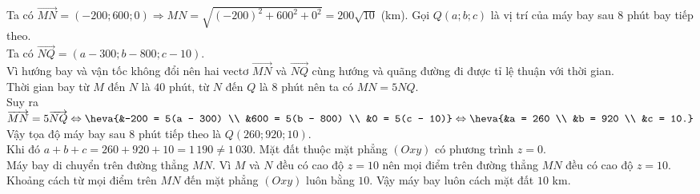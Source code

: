 \begin{ex}
{\begin{center}
		\end{center}
		\begin{itemchoice}
			\itemch Ta có $\overrightarrow{MN} = (-200; 600; 0) \Rightarrow MN = \sqrt{(-200)^2 + 600^2 + 0^2} = 200\sqrt{10}$ (km).
			\itemch Gọi $Q(a; b; c)$ là vị trí của máy bay sau $8$ phút bay tiếp theo.\\
			Ta có $\overrightarrow{NQ} = (a - 300; b - 800; c - 10)$.\\
			Vì hướng bay và vận tốc không đổi nên hai vectơ $\overrightarrow{MN}$ và $\overrightarrow{NQ}$ cùng hướng và quãng đường đi được tỉ lệ thuận với thời gian.\\
			Thời gian bay từ $M$ đến $N$ là $40$ phút, từ $N$ đến $Q$ là $8$ phút nên ta có $MN = 5NQ$.\\
			Suy ra $\overrightarrow{MN} = 5\overrightarrow{NQ} \Leftrightarrow \heva{&-200 = 5(a - 300) \\ &600 = 5(b - 800) \\ &0 = 5(c - 10)} \Leftrightarrow \heva{&a = 260 \\ &b = 920 \\ &c = 10.}$\\
			Vậy tọa độ máy bay sau $8$ phút tiếp theo là $Q(260; 920; 10)$.\\
			Khi đó $a + b + c = 260 + 920 + 10 = 1\,190 \neq 1\,030$.
			\itemch Mặt đất thuộc mặt phẳng $(Oxy)$ có phương trình $z = 0$.\\
			Máy bay di chuyển trên đường thẳng $MN$. Vì $M$ và $N$ đều có cao độ $z = 10$ nên mọi điểm trên đường thẳng $MN$ đều có cao độ $z = 10$.\\
			Khoảng cách từ mọi điểm trên $MN$ đến mặt phẳng $(Oxy)$ luôn bằng $10$. Vậy máy bay luôn cách mặt đất $10$ km.

\end{itemchoice}}
\end{ex}
